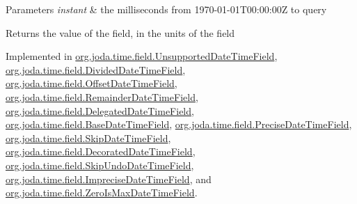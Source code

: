 \begin{DoxyParams}{Parameters}
{\em instant} & the milliseconds from 1970-\/01-\/01\-T00\-:00\-:00\-Z to query \\
\hline
\end{DoxyParams}
\begin{DoxyReturn}{Returns}
the value of the field, in the units of the field 
\end{DoxyReturn}


Implemented in \hyperlink{classorg_1_1joda_1_1time_1_1field_1_1_unsupported_date_time_field_a3758edd6f1a962593a62d1cadadff53f}{org.\-joda.\-time.\-field.\-Unsupported\-Date\-Time\-Field}, \hyperlink{classorg_1_1joda_1_1time_1_1field_1_1_divided_date_time_field_a706fee5929e7b887d560889134c9ad20}{org.\-joda.\-time.\-field.\-Divided\-Date\-Time\-Field}, \hyperlink{classorg_1_1joda_1_1time_1_1field_1_1_offset_date_time_field_acc5e5079abfdca1478f46e4a9f633097}{org.\-joda.\-time.\-field.\-Offset\-Date\-Time\-Field}, \hyperlink{classorg_1_1joda_1_1time_1_1field_1_1_remainder_date_time_field_a9e2df35ca0d2b0206c179964258a4b4d}{org.\-joda.\-time.\-field.\-Remainder\-Date\-Time\-Field}, \hyperlink{classorg_1_1joda_1_1time_1_1field_1_1_delegated_date_time_field_ae90a3343fe55e720e8a9677c71c7fd83}{org.\-joda.\-time.\-field.\-Delegated\-Date\-Time\-Field}, \hyperlink{classorg_1_1joda_1_1time_1_1field_1_1_base_date_time_field_abf5b59083b265cd3031cc5e6fed8419e}{org.\-joda.\-time.\-field.\-Base\-Date\-Time\-Field}, \hyperlink{classorg_1_1joda_1_1time_1_1field_1_1_precise_date_time_field_ae0dd25539a104e1aeba64b80efff08e8}{org.\-joda.\-time.\-field.\-Precise\-Date\-Time\-Field}, \hyperlink{classorg_1_1joda_1_1time_1_1field_1_1_skip_date_time_field_a1e215ec135ce0a1d107ea680b48bea77}{org.\-joda.\-time.\-field.\-Skip\-Date\-Time\-Field}, \hyperlink{classorg_1_1joda_1_1time_1_1field_1_1_decorated_date_time_field_a16c65d5fd974660e6f23ad75261ee51f}{org.\-joda.\-time.\-field.\-Decorated\-Date\-Time\-Field}, \hyperlink{classorg_1_1joda_1_1time_1_1field_1_1_skip_undo_date_time_field_a90e9ad6ff0be34bd392cf416a5c8166a}{org.\-joda.\-time.\-field.\-Skip\-Undo\-Date\-Time\-Field}, \hyperlink{classorg_1_1joda_1_1time_1_1field_1_1_imprecise_date_time_field_ab9b45f89dd2abe6df0e28178810d0134}{org.\-joda.\-time.\-field.\-Imprecise\-Date\-Time\-Field}, and \hyperlink{classorg_1_1joda_1_1time_1_1field_1_1_zero_is_max_date_time_field_ae7e6180434e6e3a93a266951ce547d0f}{org.\-joda.\-time.\-field.\-Zero\-Is\-Max\-Date\-Time\-Field}.

